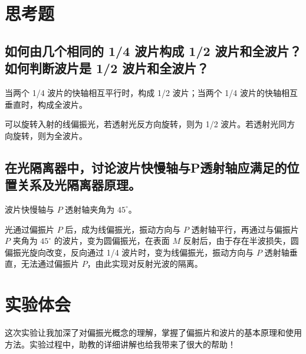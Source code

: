 \documentclass[a4paper]{article}
\begin{document}
\section{思考题}

\subsection{如何由几个相同的 1/4 波片构成 1/2 波片和全波片？如何判断波片是 1/2 波片和全波片？}

\par 当两个 1/4 波片的快轴相互平行时，构成 1/2 波片；当两个 1/4 波片的快轴相互垂直时，构成全波片。

\par 可以旋转入射的线偏振光，若透射光反方向旋转，则为 1/2 波片。若透射光同方向旋转，则为全波片。

\subsection{在光隔离器中，讨论波片快慢轴与P透射轴应满足的位置关系及光隔离器原理。}

\par 波片快慢轴与 $P$ 透射轴夹角为 $45^\circ$。

\par 光通过偏振片 $P$ 后，成为线偏振光，振动方向与 $P$ 透射轴平行，再通过与偏振片 $P$ 夹角为 $45^\circ$ 的波片，变为圆偏振光，在表面 $M$ 反射后，由于存在半波损失，圆偏振光旋向改变，反向通过 1/4 波片时，变为线偏振光，振动方向与 $P$ 透射轴垂直，无法通过偏振片 $P$，由此实现对反射光波的隔离。

\section{实验体会}

\par 这次实验让我加深了对偏振光概念的理解，掌握了偏振片和波片的基本原理和使用方法。实验过程中，助教的详细讲解也给我带来了很大的帮助！
\end{document}
